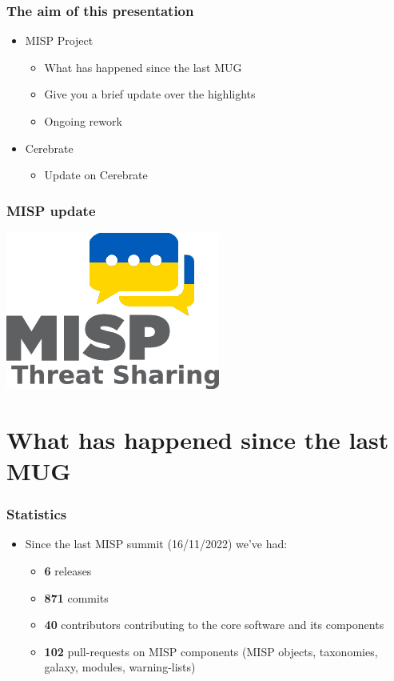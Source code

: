 
\begin{frame}
\titlepage
\end{frame}

\begin{frame}
  \frametitle{The aim of this presentation}
  \begin{itemize}
    \item MISP Project
    \begin{itemize}
     \item What has happened since the last MUG
     \item Give you a brief update over the highlights
     \item Ongoing rework
    \end{itemize}
    \item Cerebrate
    \begin{itemize}
     \item Update on Cerebrate
    \end{itemize}
  \end{itemize}
\end{frame}

\begin{frame}
\frametitle{MISP update}
\begin{center}
\includegraphics[scale=0.3]{images/misp.png}
\end{center}
\end{frame}

\section{What has happened since the last MUG}

\begin{frame}
  \frametitle{Statistics}
  \begin{itemize}
    \item Since the last MISP summit (16/11/2022) we've had:
    \begin{itemize}
        \item {\bf 6} releases
        \item {\bf 871} commits
        \item {\bf 40} contributors contributing to the core software and its components
        \item {\bf 102} pull-requests on MISP components (MISP objects, taxonomies, galaxy, modules, warning-lists)
    \end{itemize}
  \end{itemize}
\end{frame}

